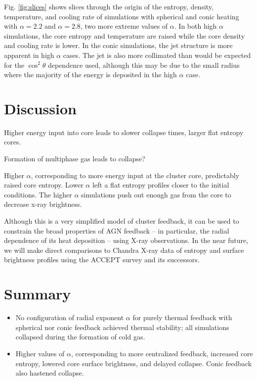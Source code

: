 \documentclass[iop,apjl, twocolappendix]{emulateapj}   %
\begin{document}
Fig. \ref{fig:slices} shows slices through the origin of the entropy, density,
temperature, and cooling rate of simulations with spherical and conic heating
with $\alpha=2.2$ and $\alpha=2.8$, two more extreme values of $\alpha$. In
both high $\alpha$ simulations, the core entropy and temperature are raised
while the core density and cooling rate is lower. In the conic simulations, the
jet structure is more apparent in high $\alpha$ cases. The jet is also more
collimated than would be expected for the $\cos^2 \theta$ dependence used,
although this may be due to the small radius where the majority of the energy
is deposited in the high $\alpha$ case.

\section{Discussion}
\label{sec:discussion}

\textbullet Higher energy input into core leads to slower collapse times, larger flat entropy cores.

\textbullet Formation of multiphase gas leads to collapse?

Higher $\alpha$, corresponding to more energy input at the cluster core,
predictably raised core entropy. Lower $\alpha$ left a flat entropy
profiles closer to the initial conditions.  The higher $\alpha$
simulations push out enough gas from the core to decrease x-ray
brightness. 

Although this is a very simplified model of cluster feedback, it can be used to
constrain the broad properties of AGN feedback -- in particular, the radial
dependence of its heat deposition -- using X-ray observations.  In the near
future, we will make direct comparisons to Chandra X-ray data of entropy and
surface brightness profiles  using the ACCEPT survey
\cite{cavagnolo_intracluster_2009} and its successors.

\section{Summary}
\label{sec:summary}

\begin{itemize}
  \item No configuration of radial exponent $\alpha$ for purely thermal feedback with
    spherical nor conic feedback achieved thermal stability; all simulations
    collapsed during the formation of cold gas.
  \item Higher values of $\alpha$, corresponding to more centralized feedback,
    increased core entropy, lowered core surface brightness, and delayed
    collapse. Conic feedback also hastened collapse.
\end{itemize}
\end{document}
